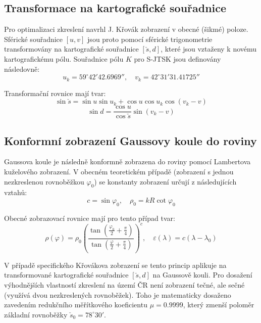 \documentclass[12pt, a4paper]{article}
\begin{document}
\subsection{Transformace na kartografické souřadnice}
Pro optimalizaci zkreslení navrhl J. Křovák zobrazení v obecné (šikmé) poloze. Sférické souřadnice $[u, v]$ jsou proto pomocí sférické trigonometrie transformovány na kartografické souřadnice $[\check{s}, d]$, které jsou vztaženy k novému kartografickému pólu. Souřadnice pólu $K$ pro S-JTSK jsou definovány následovně:
\begin{equation}
    u_k = 59^\circ 42' 42.6969'', \quad v_k = 42^\circ 31' 31.41725''
\end{equation}

Transformační rovnice mají tvar:
\begin{equation}
    \sin \check{s} = \sin u \sin u_k + \cos u \cos u_k \cos(v_k - v)
\end{equation}
\begin{equation}
    \sin d = \frac{\cos u}{\cos \check{s}} \sin(v_k - v)
\end{equation}

\subsection{Konformní zobrazení Gaussovy koule do roviny}
Gaussova koule je následně konformně zobrazena do roviny pomocí Lambertova kuželového zobrazení. V obecném teoretickém případě (zobrazení s jednou nezkreslenou rovnoběžkou $\varphi_0$) se konstanty zobrazení určují z následujících vztahů:
\begin{equation}
    c = \sin \varphi_0, \quad \rho_0 = k R \cot \varphi_0
\end{equation}

Obecné zobrazovací rovnice mají pro tento případ tvar:
\begin{equation}
    \rho(\varphi) = \rho_0 \left( \frac{\tan\left(\frac{\varphi_0}{2} + \frac{\pi}{4}\right)}{\tan\left(\frac{\varphi}{2} + \frac{\pi}{4}\right)} \right)^c, \quad \varepsilon(\lambda) = c (\lambda - \lambda_0)
\end{equation}

V případě specifického Křovákova zobrazení se tento princip aplikuje na transformované kartografické souřadnice $[\check{s}, d]$ na Gaussově kouli. Pro dosažení výhodnějších vlastností zkreslení na území ČR není zobrazení tečné, ale sečné (využívá dvou nezkreslených rovnoběžek). Toho je matematicky dosaženo zavedením redukčního měřítkového koeficientu $\mu = 0.9999$, který zmenší poloměr základní rovnoběžky $\check{s}_0 = 78^\circ 30'$.
\end{document}
